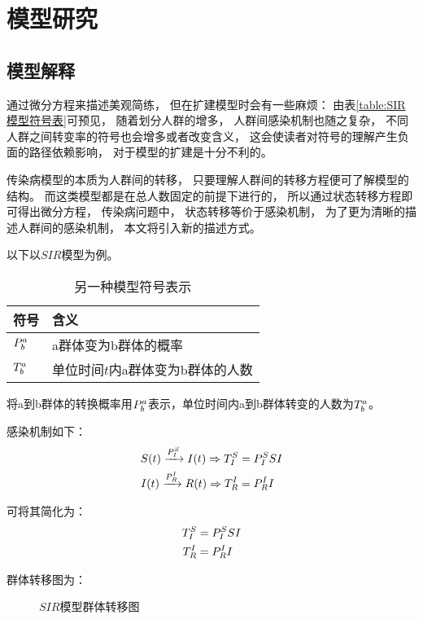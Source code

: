 \section{模型研究}
\subsection{模型解释}
\par 通过微分方程来描述美观简练，
但在扩建模型时会有一些麻烦：
由表\ref{table:SIR模型符号表}可预见，
随着划分人群的增多，
人群间感染机制也随之复杂，
不同人群之间转变率的符号也会增多或者改变含义，
这会使读者对符号的理解产生负面的路径依赖影响，
对于模型的扩建是十分不利的。
\par 传染病模型的本质为人群间的转移，
只要理解人群间的转移方程便可了解模型的结构。
而这类模型都是在总人数固定的前提下进行的，
所以通过状态转移方程即可得出微分方程，
传染病问题中，
状态转移等价于感染机制，
为了更为清晰的描述人群间的感染机制，
本文将引入新的描述方式。
\par 以下以$SIR$模型为例。
\begin{table}[H]
    \centering
    \caption{另一种模型符号表示}
    \begin{tabular}{ll}
        \hline
        符号       & 含义                              \\
        \hline
        $\P{a}{b}$ & a群体变为b群体的概率              \\
        $\T{a}{b}$ & 单位时间$t$内a群体变为b群体的人数 \\
        \hline
    \end{tabular}
\end{table}
\par 将a到b群体的转换概率用$\P{a}{b}$表示，单位时间内a到b群体转变的人数为$\T{a}{b}$。
\par 感染机制如下：
\begin{align}
    S(t)\xrightarrow{\P{S}{I}}I(t) \Rightarrow \TP{S}{I}{SI} \\
    I(t)\xrightarrow{\P{I}{R}}R(t) \Rightarrow \TP{I}{R}{I}
\end{align}
\par 可将其简化为：
\begin{align}
    \TP{S}{I}{SI} \label{math:TSI} \\
    \TP{I}{R}{I} \label{math:TIR}
\end{align}
\par 群体转移图为：
\begin{figure}[H]
    \centering
    \caption{$SIR$模型群体转移图}
\end{figure}

